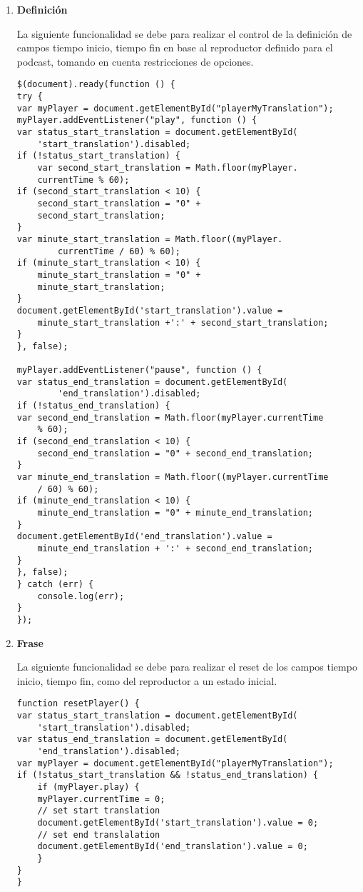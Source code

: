 \begin{enumerate}

\item \textbf{Definici\'{o}n }

La siguiente funcionalidad se debe para realizar el control de la definici\'{o}n
de campos tiempo inicio, tiempo fin en base al reproductor definido para el podcast,
tomando en cuenta restricciones de opciones.

\begin{lstlisting}[]
$(document).ready(function () {
try {
var myPlayer = document.getElementById("playerMyTranslation");
myPlayer.addEventListener("play", function () {
var status_start_translation = document.getElementById(
    'start_translation').disabled;
if (!status_start_translation) {
    var second_start_translation = Math.floor(myPlayer.
    currentTime % 60);
if (second_start_translation < 10) {
    second_start_translation = "0" + 
    second_start_translation;
}
var minute_start_translation = Math.floor((myPlayer.
        currentTime / 60) % 60);
if (minute_start_translation < 10) {
    minute_start_translation = "0" + 
    minute_start_translation;
}
document.getElementById('start_translation').value = 
    minute_start_translation +':' + second_start_translation;
}
}, false);

myPlayer.addEventListener("pause", function () {
var status_end_translation = document.getElementById(
        'end_translation').disabled;
if (!status_end_translation) {
var second_end_translation = Math.floor(myPlayer.currentTime 
    % 60);
if (second_end_translation < 10) {
    second_end_translation = "0" + second_end_translation;
}
var minute_end_translation = Math.floor((myPlayer.currentTime 
    / 60) % 60);
if (minute_end_translation < 10) {
    minute_end_translation = "0" + minute_end_translation;
}
document.getElementById('end_translation').value = 
    minute_end_translation + ':' + second_end_translation;
}
}, false);
} catch (err) {
    console.log(err);
}
});
\end{lstlisting}

\item \textbf{Frase }

La siguiente funcionalidad se debe para realizar el reset de los campos tiempo
inicio, tiempo fin, como del reproductor a un estado inicial.

\begin{lstlisting}[]
function resetPlayer() {
var status_start_translation = document.getElementById(
    'start_translation').disabled;
var status_end_translation = document.getElementById(
    'end_translation').disabled;
var myPlayer = document.getElementById("playerMyTranslation");
if (!status_start_translation && !status_end_translation) {
    if (myPlayer.play) {
    myPlayer.currentTime = 0;
    // set start translation
    document.getElementById('start_translation').value = 0;
    // set end translalation
    document.getElementById('end_translation').value = 0;
    }
}
}
\end{lstlisting}

\end{enumerate}